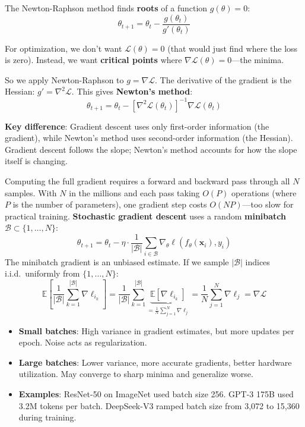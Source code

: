 \begin{remark}
    The Newton-Raphson method finds \textbf{roots} of a function $g(\theta) = 0$:
    \[
        \theta_{t+1} = \theta_t - \frac{g(\theta_t)}{g'(\theta_t)}
    \]

    For optimization, we don't want $\mathcal{L}(\theta) = 0$ (that would just find where the loss is zero). Instead, we want \textbf{critical points} where $\nabla\mathcal{L}(\theta) = 0$---the minima.

    So we apply Newton-Raphson to $g = \nabla\mathcal{L}$. The derivative of the gradient is the Hessian: $g' = \nabla^2\mathcal{L}$. This gives \textbf{Newton's method}:
    \[
        \theta_{t+1} = \theta_t - [\nabla^2 \mathcal{L}(\theta_t)]^{-1} \nabla\mathcal{L}(\theta_t)
    \]

    \textbf{Key difference}: Gradient descent uses only first-order information (the gradient), while Newton's method uses second-order information (the Hessian). Gradient descent follows the slope; Newton's method accounts for how the slope itself is changing.
\end{remark}

\begin{definition}
    Computing the full gradient requires a forward and backward pass through all $N$ samples. With $N$ in the millions and each pass taking $O(P)$ operations (where $P$ is the number of parameters), one gradient step costs $O(NP)$---too slow for practical training. \textbf{Stochastic gradient descent} uses a random \textbf{minibatch} $\mathcal{B} \subset \{1, \ldots, N\}$:
    \[
        \theta_{t+1} = \theta_t - \eta \cdot \frac{1}{|\mathcal{B}|} \sum_{i \in \mathcal{B}} \nabla_\theta \ell(f_\theta(\mathbf{x}_i), y_i)
    \]
    The minibatch gradient is an unbiased estimate. If we sample $|\mathcal{B}|$ indices i.i.d.\ uniformly from $\{1,\ldots,N\}$:
    \[
        \mathbb{E}\left[\frac{1}{|\mathcal{B}|} \sum_{k=1}^{|\mathcal{B}|} \nabla \ell_{i_k}\right] = \frac{1}{|\mathcal{B}|} \sum_{k=1}^{|\mathcal{B}|} \underbrace{\mathbb{E}[\nabla\ell_{i_k}]}_{= \frac{1}{N}\sum_{j=1}^{N}\nabla\ell_j} = \frac{1}{N}\sum_{j=1}^{N} \nabla \ell_j = \nabla \mathcal{L}
    \]
\end{definition}

\begin{remark}\leavevmode
    \begin{itemize}
        \item \textbf{Small batches}: High variance in gradient estimates, but more updates per epoch. Noise acts as regularization.
        \item \textbf{Large batches}: Lower variance, more accurate gradients, better hardware utilization. May converge to sharp minima and generalize worse.
        \item \textbf{Examples}: ResNet-50 on ImageNet used batch size 256. GPT-3 175B used 3.2M tokens per batch. DeepSeek-V3 ramped batch size from 3,072 to 15,360 during training.
    \end{itemize}
\end{remark}


